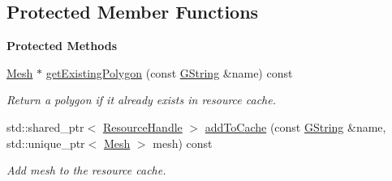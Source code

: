 \subsection*{Protected Member Functions}
\begin{Indent}\textbf{ Protected Methods}\par
\begin{DoxyCompactItemize}
\item 
\mbox{\label{classrev_1_1_polygon_cache_aa698061f5bd07abd1a296f8e241f59df}} 
\mbox{\hyperlink{classrev_1_1_mesh}{Mesh}} $\ast$ \mbox{\hyperlink{classrev_1_1_polygon_cache_aa698061f5bd07abd1a296f8e241f59df}{get\+Existing\+Polygon}} (const \mbox{\hyperlink{classrev_1_1_g_string}{G\+String}} \&name) const
\begin{DoxyCompactList}\small\item\em Return a polygon if it already exists in resource cache. \end{DoxyCompactList}\item 
\mbox{\label{classrev_1_1_polygon_cache_a9a70e4edebae39d93c8072fb8c2480a7}} 
std\+::shared\+\_\+ptr$<$ \mbox{\hyperlink{classrev_1_1_resource_handle}{Resource\+Handle}} $>$ \mbox{\hyperlink{classrev_1_1_polygon_cache_a9a70e4edebae39d93c8072fb8c2480a7}{add\+To\+Cache}} (const \mbox{\hyperlink{classrev_1_1_g_string}{G\+String}} \&name, std\+::unique\+\_\+ptr$<$ \mbox{\hyperlink{classrev_1_1_mesh}{Mesh}} $>$ mesh) const
\begin{DoxyCompactList}\small\item\em Add mesh to the resource cache. \end{DoxyCompactList}\end{DoxyCompactItemize}
\end{Indent}
